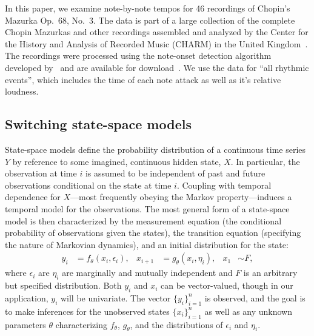 \documentclass[aoas]{imsart}
\begin{document}
In this paper, we examine note-by-note tempos for 46 recordings of
Chopin's Mazurka Op.\ 68, No.\ 3. The data is part of a large
collection of the complete Chopin Mazurkas and other recordings
assembled and analyzed by the Center for the History and Analysis of
Recorded Music (CHARM) in the United Kingdom~\citep{CHARM-site}. The
recordings were processed using the note-onset detection algorithm
developed by~\citet{Earis2007} and are available for
download~\citep{Earis2009}. We use the data for ``all rhythmic
events'', which includes the time of each note attack as well as it's
relative loudness.

\subsection{Switching state-space models}
\label{sec:switch-state-space}

State-space models define the probability distribution of a continuous
time series $Y$ by reference to some imagined, continuous hidden state, $X$. In
particular, the observation at time $i$ is assumed to be
independent of past and future observations conditional on the state
at time $i$. Coupling with temporal dependence for $X$---most
frequently obeying the Markov property---induces a temporal model for
the observations.  The most general form of a state-space model is
then characterized by the 
measurement equation (the conditional probability of observations
given the states),
the transition equation (specifying the nature of Markovian
dynamics), and an initial distribution for the state: 
\begin{equation}
\begin{aligned}
  y_i &= f_\theta(x_i,\epsilon_i), &
  x_{i+1} &= g_\theta(x_i,\eta_i), &
  x_1 &\sim F,
\end{aligned}
\label{eq:ssmod}
\end{equation}
where $\epsilon_i$ are $\eta_i$ are marginally and mutually independent and $F$ is
an arbitrary but specified distribution. Both
$y_i$ and $x_i$ can be vector-valued, though in our
application, $y_i$ will be univariate. The
vector $\{y_i\}_{i=1}^n$ is observed, and the goal is to make
inferences for the unobserved states $\{x_i\}_{i=1}^n$ as well as any
unknown parameters $\theta$ characterizing $f_\theta$, $g_\theta$, and
the distributions of $\epsilon_i$ and $\eta_i$.
\end{document}
